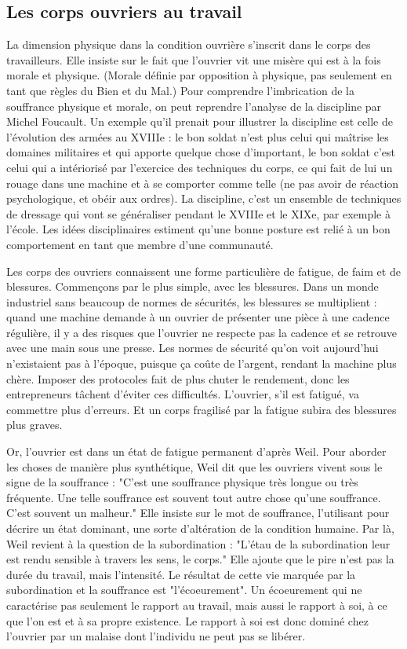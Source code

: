 \documentclass[a4paper,12pt]{book}
\begin{document}
\subsection{Les corps ouvriers au travail}
La dimension physique dans la condition ouvrière s'inscrit dans le corps des travailleurs. Elle insiste sur le fait que l'ouvrier vit une misère qui est à la fois morale et physique. (Morale définie par opposition à physique, pas seulement en tant que règles du Bien et du Mal.) Pour comprendre l'imbrication de la souffrance physique et morale, on peut reprendre l'analyse de la discipline par Michel Foucault. Un exemple qu'il prenait pour illustrer la discipline est celle de l'évolution des armées au XVIIIe : le bon soldat n'est plus celui qui maîtrise les domaines militaires et qui apporte quelque chose d'important, le bon soldat c'est celui qui a intériorisé par l'exercice des techniques du corps, ce qui fait de lui un rouage dans une machine et à se comporter comme telle (ne pas avoir de réaction psychologique, et obéir aux ordres). La discipline, c'est un ensemble de techniques de dressage qui vont se généraliser pendant le XVIIIe et le XIXe, par exemple à l'école. Les idées disciplinaires estiment qu'une bonne posture est relié à un bon comportement en tant que membre d'une communauté.
\par Les corps des ouvriers connaissent une forme particulière de fatigue, de faim et de blessures. Commençons par le plus simple, avec les blessures. Dans un monde industriel sans beaucoup de normes de sécurités, les blessures se multiplient : quand une machine demande à un ouvrier de présenter une pièce à une cadence régulière, il y a des risques que l'ouvrier ne respecte pas la cadence et se retrouve avec une main sous une presse. Les normes de sécurité qu'on voit aujourd'hui n'existaient pas à l'époque, puisque ça coûte de l'argent, rendant la machine plus chère. Imposer des protocoles fait de plus chuter le rendement, donc les entrepreneurs tâchent d'éviter ces difficultés. L'ouvrier, s'il est fatigué, va commettre plus d'erreurs. Et un corps fragilisé par la fatigue subira des blessures plus graves.
\par Or, l'ouvrier est dans un état de fatigue permanent d'après Weil. Pour aborder les choses de manière plus synthétique, Weil dit que les ouvriers vivent sous le signe de la souffrance : "C'est une souffrance physique très longue ou très fréquente. Une telle souffrance est souvent tout autre chose qu'une souffrance. C'est souvent un malheur." Elle insiste sur le mot de souffrance, l'utilisant pour décrire un état dominant, une sorte d'altération de la condition humaine. Par là, Weil revient à la question de la subordination : "L'étau de la subordination leur est rendu sensible à travers les sens, le corps." Elle ajoute que le pire n'est pas la durée du travail, mais l'intensité. Le résultat de cette vie marquée par la subordination et la souffrance est "l'écoeurement". Un écoeurement qui ne caractérise pas seulement le rapport au travail, mais aussi le rapport à soi, à ce que l'on est et à sa propre existence. Le rapport à soi est donc dominé chez l'ouvrier par un malaise dont l'individu ne peut pas se libérer.
\end{document}
